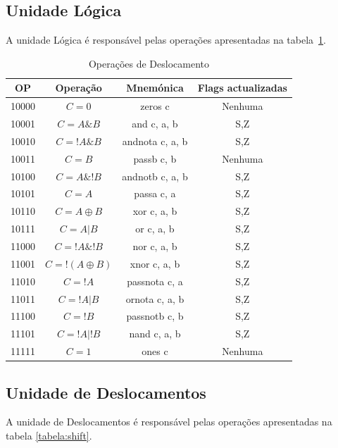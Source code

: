 \subsection{Unidade Lógica}

A unidade Lógica é responsável pelas operações apresentadas na tabela~\ref{tabela:logic}.\\

\begin{table}[h]
	\centering
	\begin{tabular}{|c|c|c|c|}
		\hline
		OP    & Operação & Mnemónica & Flags actualizadas \\ \hline
		10000 & \mbox{$C=0$}    & zeros c   & Nenhuma  \\ \hline
		10001 & \mbox{$C=A\&B$}  & and c, a, b & S,Z   \\ \hline
		10010 & \mbox{$C=!A\&B$}  & andnota c, a, b & S,Z   \\ \hline
		10011 & \mbox{$C=B$}  & passb c, b &  Nenhuma  \\ \hline
		10100 & \mbox{$C=A\&!B$}  & andnotb c, a, b & S,Z   \\ \hline
		10101 & \mbox{$C=A$}  & passa c, a & S,Z   \\ \hline
		10110 & \mbox{$C=A \oplus B$}  & xor c, a, b & S,Z   \\ \hline
		10111 & \mbox{$C=A|B$}  & or c, a, b & S,Z   \\ \hline
		11000 & \mbox{$C=!A\&!B$}  & nor c, a, b & S,Z   \\ \hline
		11001 & \mbox{$C=!(A \oplus B)$}  & xnor c, a, b & S,Z   \\ \hline
		11010 & \mbox{$C=!A$}  & passnota c, a & S,Z   \\ \hline
		11011 & \mbox{$C=!A|B$}  & ornota c, a, b & S,Z   \\ \hline
		11100 & \mbox{$C=!B$}  & passnotb c, b & S,Z   \\ \hline
		11101 & \mbox{$C=!A|!B$}  & nand c, a, b & S,Z   \\ \hline
		11111 & \mbox{$C=1$}  & ones c & Nenhuma   \\ \hline
	\end{tabular}
	\caption{Operações de Deslocamento}
	\label{tabela:logic}
\end{table}
\newpage
\subsection{Unidade de Deslocamentos}
A unidade de Deslocamentos é responsável pelas operações apresentadas na tabela \ref{tabela:shift}.\\

